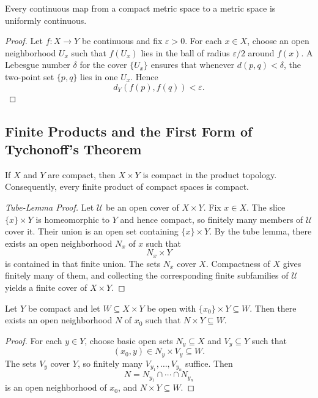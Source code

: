 \begin{corollary}
Every continuous map from a compact metric space to a metric space is uniformly continuous.
\end{corollary}

\begin{proof}
Let $f:X\to Y$ be continuous and fix $\varepsilon>0$. For each $x\in X$, choose an open neighborhood $U_x$ such that $f(U_x)$ lies in the ball of radius $\varepsilon/2$ around $f(x)$. A Lebesgue number $\delta$ for the cover $\{U_x\}$ ensures that whenever $d(p,q)<\delta$, the two-point set $\{p,q\}$ lies in one $U_x$. Hence
\[
    d_Y(f(p),f(q))<\varepsilon.
\]
\end{proof}

\subsection{Finite Products and the First Form of Tychonoff's Theorem}

\begin{theorem}
If $X$ and $Y$ are compact, then $X\times Y$ is compact in the product topology. Consequently, every finite product of compact spaces is compact.
\end{theorem}

\begin{proof}[Tube-Lemma Proof]
Let $\mathcal{U}$ be an open cover of $X\times Y$. Fix $x\in X$. The slice $\{x\}\times Y$ is homeomorphic to $Y$ and hence compact, so finitely many members of $\mathcal{U}$ cover it. Their union is an open set containing $\{x\}\times Y$. By the tube lemma, there exists an open neighborhood $N_x$ of $x$ such that
\[
    N_x\times Y
\]
is contained in that finite union. The sets $N_x$ cover $X$. Compactness of $X$ gives finitely many of them, and collecting the corresponding finite subfamilies of $\mathcal{U}$ yields a finite cover of $X\times Y$.
\end{proof}

\begin{lemma}
Let $Y$ be compact and let $W\subseteq X\times Y$ be open with $\{x_0\}\times Y\subseteq W$. Then there exists an open neighborhood $N$ of $x_0$ such that $N\times Y\subseteq W$.
\end{lemma}

\begin{proof}
For each $y\in Y$, choose basic open sets $N_y\subseteq X$ and $V_y\subseteq Y$ such that
\[
    (x_0,y)\in N_y\times V_y\subseteq W.
\]
The sets $V_y$ cover $Y$, so finitely many $V_{y_1},\dots,V_{y_n}$ suffice. Then
\[
    N=N_{y_1}\cap\cdots\cap N_{y_n}
\]
is an open neighborhood of $x_0$, and $N\times Y\subseteq W$.
\end{proof}

